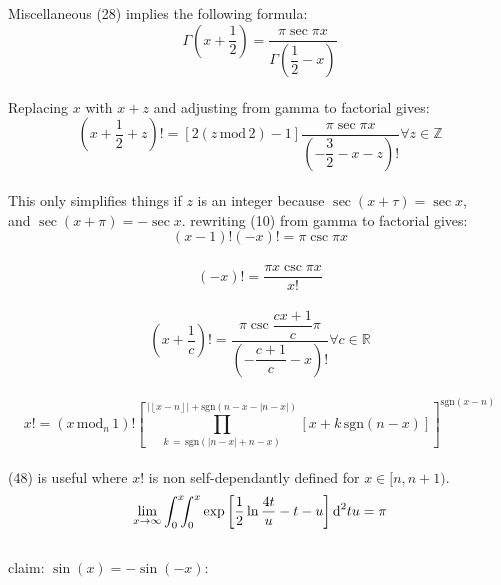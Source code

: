 \documentclass[12pt]{article}
\begin{document}
\pagebreak\begin{section}{Miscellaneous}
	(28) implies the following formula:
	\begin{equation}
		\Gamma\left(x+\dfrac12\right)=\dfrac{\pi\sec\pi x}{\Gamma\left(\dfrac12-x\right)}
	\end{equation}\\ %
	Replacing $x$ with $x+z$ and adjusting from gamma to factorial gives:\\
	\begin{equation}
		\left(x+\frac12+z\right)!=\left[2\left(z\,\text{mod}\,2\right)-1\right]\dfrac{\pi\sec\pi x}{\left(-\dfrac32-x-z\right)!}\forall z\in\mathbb Z
	\end{equation}\\ %
	This only simplifies things if $z$ is an integer because $\sec(x+\tau)=\sec x$,\\
	and $\sec(x+\pi)=-\sec x$. rewriting (10) from gamma to factorial gives:
	\begin{equation}
		(x-1)!(-x)!=\pi\csc\pi x
	\end{equation}\\ %
	\begin{equation}
		(-x)!=\dfrac{\pi x\csc\pi x}{x!}
	\end{equation}\\ %
	\begin{equation}
		\left(x+\dfrac1c\right)!=\dfrac{\pi\csc\dfrac{cx+1}c\pi}{\left(-\dfrac{c+1}c-x\right)!}\forall c\in\mathbb R
	\end{equation}\\ %
	\begin{equation}
		x!=\left(x\,\text{mod}_n\,1\right)!\left[\prod_{k\,=\,\text{sgn}(\left|n-x\right|+n-x)}^{\left|\left\lfloor x-n\right\rfloor\right|+\text{sgn}\left(n-x-\left|n-x\right|\right)}\left[x+k\,\text{sgn}\left(n-x\right)\right]\right]^{\text{sgn}\left(x-n\right)}
	\end{equation}\\ %
	(48) is useful where $x!$ is non self-dependantly defined for $x\in[n,n+1)$.\\
	\begin{equation}
		\lim_{x\to\infty}\int_0^x\hspace{-0.5em}\int_0^x\exp\left[\dfrac12\ln\dfrac{4t}u-t-u\right]\text d^2tu=\pi
	\end{equation} %
	\pagebreak\\
	claim: $\sin(x)=-\sin(-x)$:\\

\end{section}
\end{document}
